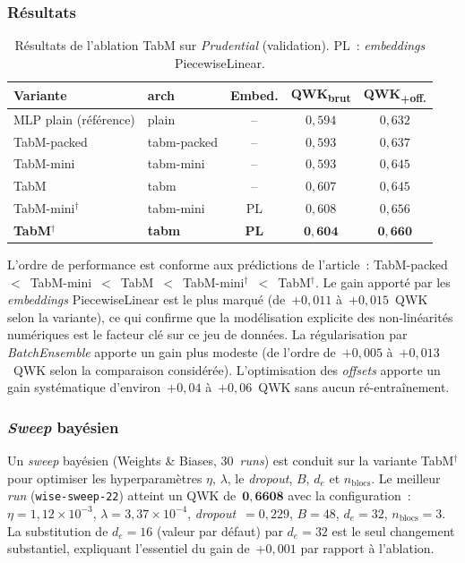 \documentclass[conference]{IEEEtran}
\begin{document}
\subsubsection{Résultats}

\begin{table}[htbp]
\caption{Résultats de l'ablation TabM sur \textit{Prudential} (validation). PL~: \textit{embeddings} PiecewiseLinear.}
\label{tab:ablation_tabm}
\centering
\begin{tabular}{llccc}
\toprule
\textbf{Variante} & \textbf{arch} & \textbf{Embed.} &
\textbf{QWK\textsubscript{brut}} & \textbf{QWK\textsubscript{+off.}} \\
\midrule
MLP plain (référence)         & plain        & --  & $0{,}594$          & $0{,}632$ \\
TabM-packed                   & tabm-packed  & --  & $0{,}593$          & $0{,}637$ \\
TabM-mini                     & tabm-mini    & --  & $0{,}593$          & $0{,}645$ \\
TabM                          & tabm         & --  & $0{,}607$          & $0{,}645$ \\
TabM-mini$^{\dagger}$         & tabm-mini    & PL  & $0{,}608$          & $0{,}656$ \\
\textbf{TabM$^{\dagger}$}     & \textbf{tabm}& \textbf{PL} &
$\mathbf{0{,}604}$ & $\mathbf{0{,}660}$ \\
\bottomrule
\end{tabular}
\end{table}

L'ordre de performance est conforme aux prédictions de l'article~: TabM-packed~$<$~TabM-mini~$<$~TabM~$<$~TabM-mini$^{\dagger}$~$<$~TabM$^{\dagger}$. Le gain apporté par les \textit{embeddings} PiecewiseLinear est le plus marqué (de~$+0{,}011$ à~$+0{,}015$~QWK selon la variante), ce qui confirme que la modélisation explicite des non-linéarités numériques est le facteur clé sur ce jeu de données. La régularisation par \textit{BatchEnsemble} apporte un gain plus modeste (de l'ordre de~$+0{,}005$ à~$+0{,}013$~QWK selon la comparaison considérée). L'optimisation des \textit{offsets} apporte un gain systématique d'environ~$+0{,}04$ à~$+0{,}06$~QWK sans aucun ré-entraînement.

\subsubsection{\textit{Sweep} bayésien}

Un \textit{sweep} bayésien (Weights \& Biases, 30~\textit{runs}) est conduit sur la variante TabM$^{\dagger}$ pour optimiser les hyperparamètres $\eta$, $\lambda$, le \textit{dropout}, $B$, $d_e$ et $n_{\text{blocs}}$. Le meilleur \textit{run} (\texttt{wise-sweep-22}) atteint un QWK de~$\mathbf{0{,}6608}$ avec la configuration~: $\eta=1{,}12\times 10^{-3}$, $\lambda=3{,}37\times 10^{-4}$, \textit{dropout}~$=0{,}229$, $B=48$, $d_e=32$, $n_{\text{blocs}}=3$. La substitution de $d_e=16$ (valeur par défaut) par $d_e=32$ est le seul changement substantiel, expliquant l'essentiel du gain de~$+0{,}001$ par rapport à l'ablation.
\end{document}
